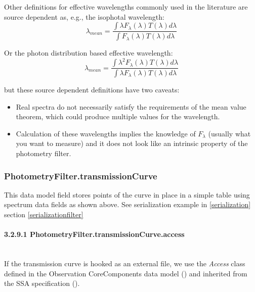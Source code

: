 \documentclass[11pt,a4paper]{ivoa}
\begin{document}
Other definitions for effective wavelengths commonly used in the literature 
are source dependent as, e.g., the isophotal wavelength:
\begin{equation} \label{eq:19}
\lambda_{mean} = \frac{\int \lambda F_\lambda(\lambda)T(\lambda)d\lambda}{\int F_\lambda(\lambda)T(\lambda)d\lambda}
\end{equation}

Or the photon distribution based effective wavelength:
\begin{equation} \label{eq:20}
\lambda_{mean} = \frac{\int \lambda^2 F_\lambda(\lambda)T(\lambda)d\lambda}{\int \lambda F_\lambda(\lambda)T(\lambda)d\lambda}
\end{equation}

but these source dependent definitions have two caveats:

\begin{itemize}
	\item{Real spectra do not necessarily satisfy the requirements of the mean value theorem, 
	which could produce multiple values for the wavelength.}

	\item{Calculation of these wavelengths implies the knowledge of $F_\lambda $ (usually 
	what you want to measure) and it does not look like an intrinsic property of the 
	photometry filter.}
\end{itemize}\par

\subsubsection{PhotometryFilter.transmissionCurve}
This data model field stores points of the curve in place in a simple table using spectrum 
data fields as shown above. See serialization example in \ref{serialization} section 
\ref{serializationfilter} \par

\paragraph{3.2.9.1 PhotometryFilter.transmissionCurve.access} \hspace{0pt} \\
If the transmission curve is hooked as an external file, we use the \textit{Access} class 
defined in the Observation CoreComponents data model (\citep{louys2011ivoa}) and inherited 
from the SSA specification (\citep{2012ivoatody}).
\par
\end{document}
